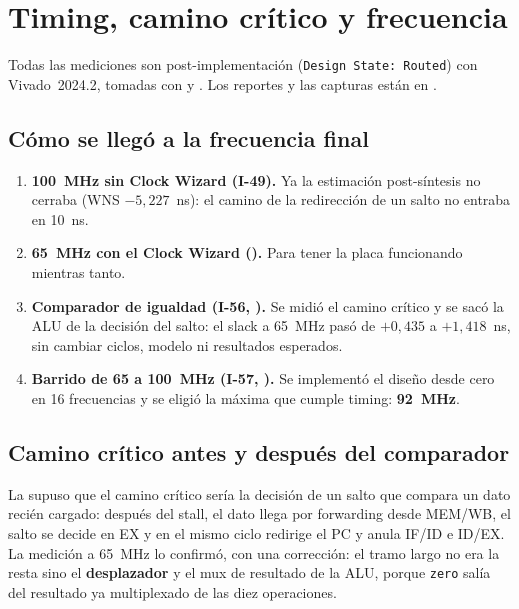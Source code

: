 \section{Timing, camino crítico y frecuencia}
\label{sec:timing}

Todas las mediciones son post-implementación (\texttt{Design State: Routed}) con Vivado~2024.2,
tomadas con  y . Los reportes y las capturas
están en .

\subsection{Cómo se llegó a la frecuencia final}

\begin{enumerate}[nosep]
  \item \textbf{\qty{100}{\mega\hertz} sin Clock Wizard (I-49).} Ya la estimación post-síntesis
        no cerraba (WNS $-5{,}227$~ns): el camino de la redirección de un salto no entraba en
        \qty{10}{\nano\second}.
  \item \textbf{\qty{65}{\mega\hertz} con el Clock Wizard ().} Para tener la placa
        funcionando mientras tanto.
  \item \textbf{Comparador de igualdad (I-56, ).} Se midió el camino crítico y se
        sacó la ALU de la decisión del salto: el slack a \qty{65}{\mega\hertz} pasó de
        $+0{,}435$ a $+1{,}418$~ns, sin cambiar ciclos, modelo ni resultados esperados.
  \item \textbf{Barrido de 65 a \qty{100}{\mega\hertz} (I-57, ).} Se implementó el
        diseño desde cero en 16 frecuencias y se eligió la máxima que cumple timing:
        \textbf{\qty{92}{\mega\hertz}}.
\end{enumerate}

\subsection{Camino crítico antes y después del comparador}

La  supuso que el camino crítico sería la decisión de un salto que compara un dato
recién cargado: después del stall, el dato llega por forwarding desde MEM/WB, el salto se decide en
EX y en el mismo ciclo redirige el PC y anula IF/ID e ID/EX. La medición a \qty{65}{\mega\hertz}
lo confirmó, con una corrección: el tramo largo no era la resta sino el \textbf{desplazador} y el
mux de resultado de la ALU, porque \texttt{zero} salía del resultado ya multiplexado de las diez
operaciones.

